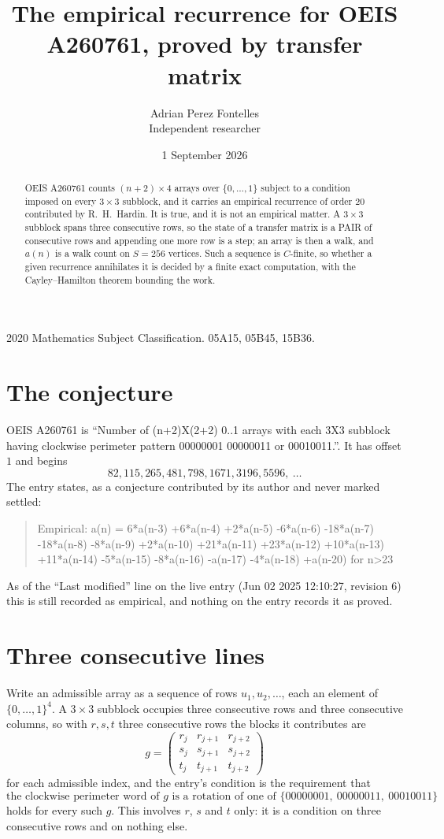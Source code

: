 \documentclass[11pt,a4paper]{article}
\title{The empirical recurrence for OEIS A260761, proved by transfer matrix}
\author{Adrian Perez Fontelles\\ \small Independent researcher}
\date{1 September 2026}
\theoremstyle{plain}
\theoremstyle{definition}
\begin{document}
\maketitle

\begin{abstract}
OEIS A260761 counts $(n+2)\times4$ arrays over $\{0,\dots,1\}$ subject to a condition imposed on
every $3\times3$ subblock, and it carries an empirical recurrence of order $20$
contributed by R.~H.~Hardin. It is true, and it is not an empirical matter. A $3\times3$
subblock spans three consecutive rows, so the state of a transfer matrix is a PAIR of
consecutive rows and appending one more row is a step; an array is then a walk, and
$a(n)$ is a walk count on $S=256$ vertices. Such a sequence is $C$-finite, so whether a given
recurrence annihilates it is decided by a finite exact computation, with the Cayley--Hamilton
theorem bounding the work.
\end{abstract}

\noindent\small 2020 Mathematics Subject Classification. 05A15, 05B45, 15B36.\normalsize

\section{The conjecture}

OEIS A260761 is ``Number of (n+2)X(2+2) 0..1 arrays with each 3X3 subblock having clockwise perimeter pattern 00000001 00000011 or 00010011.''. It has offset $1$ and begins
\[
82, 115, 265, 481, 798, 1671, 3196, 5596,\ \dots
\]
The entry states, as a conjecture contributed by its author and never marked settled:
\begin{quote}
Empirical: a(n) = 6*a(n-3) +6*a(n-4) +2*a(n-5) -6*a(n-6) -18*a(n-7) -18*a(n-8) -8*a(n-9) +2*a(n-10) +21*a(n-11) +23*a(n-12) +10*a(n-13) +11*a(n-14) -5*a(n-15) -8*a(n-16) -a(n-17) -4*a(n-18) +a(n-20) for n>23
\end{quote}
As of the ``Last modified'' line on the live entry (Jun 02 2025 12:10:27, revision 6) this is still
recorded as empirical, and nothing on the entry records it as proved.

\section{Three consecutive lines}

Write an admissible array as a sequence of rows $u_1,u_2,\dots$, each an element of
$\{0,\dots,1\}^{4}$. A $3\times3$ subblock occupies three consecutive rows and
three consecutive columns, so with $r,s,t$ three consecutive rows the blocks it
contributes are
\[
g=\begin{pmatrix}r_j&r_{j+1}&r_{j+2}\\ s_j&s_{j+1}&s_{j+2}\\ t_j&t_{j+1}&t_{j+2}\end{pmatrix}
\]
for each admissible index, and the entry's condition is the requirement that
\[
\text{the clockwise perimeter word of }g\text{ is a rotation of one of }\{00000001,\ 00000011,\ 00010011\}
\]
holds for every such $g$. This involves $r$, $s$ and $t$ only: it is a condition on
three consecutive rows and on nothing else.
\end{document}
